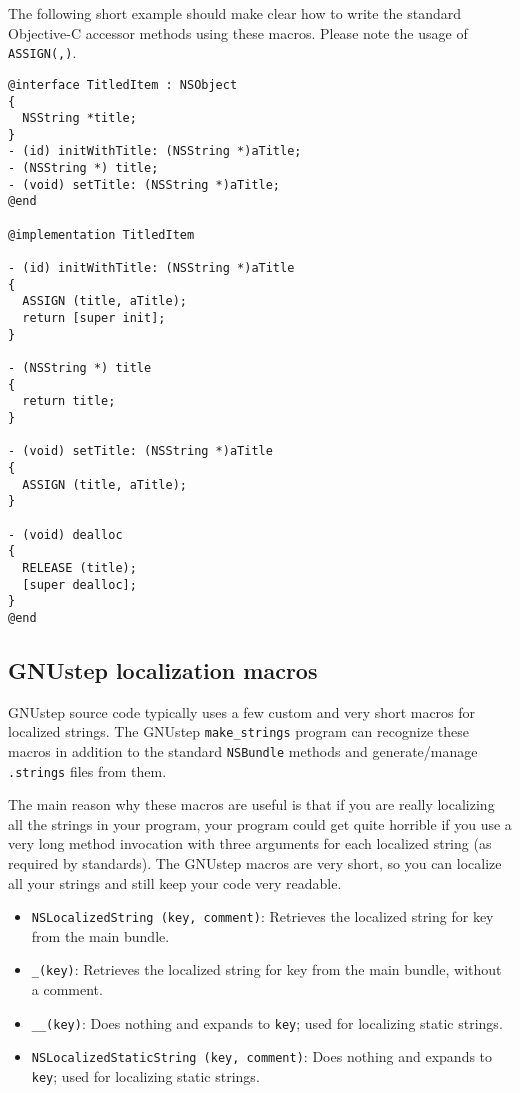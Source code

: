 The following short example should make clear how to write the
standard Objective-C accessor methods using these macros.  Please note
the usage of \texttt{ASSIGN(,)}.
\begin{verbatim}
@interface TitledItem : NSObject
{ 
  NSString *title;
}
- (id) initWithTitle: (NSString *)aTitle;
- (NSString *) title;
- (void) setTitle: (NSString *)aTitle;
@end

@implementation TitledItem

- (id) initWithTitle: (NSString *)aTitle
{
  ASSIGN (title, aTitle);
  return [super init];
}

- (NSString *) title
{
  return title;
}

- (void) setTitle: (NSString *)aTitle
{
  ASSIGN (title, aTitle);
}

- (void) dealloc
{
  RELEASE (title);
  [super dealloc];
}
@end
\end{verbatim}

\subsection{GNUstep localization macros}
GNUstep source code typically uses a few custom and very short macros
for localized strings.  The GNUstep \texttt{make\_strings} program can
recognize these macros in addition to the standard \texttt{NSBundle}
methods and generate/manage \texttt{.strings} files from them.

The main reason why these macros are useful is that if you are really
localizing all the strings in your program, your program could get
quite horrible if you use a very long method invocation with three
arguments for each localized string (as required by standards).  The
GNUstep macros are very short, so you can localize all your strings
and still keep your code very readable.

\begin{itemize}
\item \texttt{NSLocalizedString (key, comment)}: Retrieves the 
localized string for key from the main bundle.

\item \texttt{\_(key)}: Retrieves the localized string for key from the main
bundle, without a comment.

\item \texttt{\_\_(key)}: Does nothing and expands to \texttt{key};
used for localizing static strings.

\item \texttt{NSLocalizedStaticString (key, comment)}: Does nothing and
expands to \texttt{key}; used for localizing static strings.
\end{itemize}

